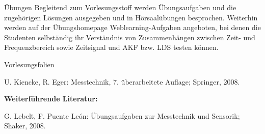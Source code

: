 \begin{course}
\begin{content}
Übungen\newline
Begleitend zum Vorlesungsstoff werden Übungsaufgaben und die zugehörigen Lösungen ausgegeben und in Hörsaalübungen besprochen. Weiterhin werden auf der Übungshomepage Weblearning-Aufgaben angeboten, bei denen die Studenten selbständig ihr Verständnis von Zusammenhängen zwischen Zeit- und Frequenzbereich sowie Zeitsignal und AKF bzw. LDS testen können.


\end{content}

\begin{media}Vorlesungsfolien

\end{media}

\begin{literature}U. Kiencke, R. Eger: Messtechnik, 7. überarbeitete Auflage; Springer, 2008.

\textbf{Weiterführende Literatur:}

G. Lebelt, F. Puente León: Übungsaufgaben zur Messtechnik und Sensorik; Shaker, 2008.

\end{literature}



\end{course}